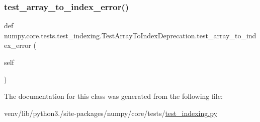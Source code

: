 \subsubsection{\texorpdfstring{test\+\_\+array\+\_\+to\+\_\+index\+\_\+error()}{test\_array\_to\_index\_error()}}
{\footnotesize\ttfamily def numpy.\+core.\+tests.\+test\+\_\+indexing.\+Test\+Array\+To\+Index\+Deprecation.\+test\+\_\+array\+\_\+to\+\_\+index\+\_\+error (\begin{DoxyParamCaption}\item[{}]{self }\end{DoxyParamCaption})}



The documentation for this class was generated from the following file\+:\begin{DoxyCompactItemize}
\item 
venv/lib/python3./site-\/packages/numpy/core/tests/\hyperlink{test__indexing_8py}{test\+\_\+indexing.\+py}\end{DoxyCompactItemize}

